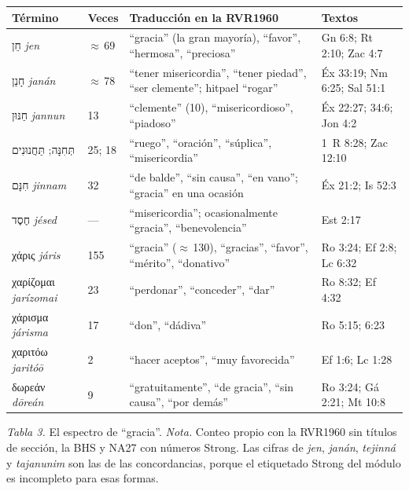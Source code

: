 \documentclass[11pt,letterpaper]{article}
\newcommand{\heb}[1]{\mbox{\foreignlanguage{hebrew}{#1}}}
\newcommand{\grc}[1]{\foreignlanguage{ancientgreek}{#1}}
\begin{document}
\begin{center}\small\renewcommand{\arraystretch}{1.16}
\begin{tabular}{@{}L{3.6cm}L{1.3cm}L{5.2cm}L{4.4cm}@{}}
\toprule
\textbf{Término} & \textbf{Veces} & \textbf{Traducción en la RVR1960} & \textbf{Textos} \\ \midrule
\heb{חֵן} \emph{jen} & $\approx$\,69 & ``gracia'' (la gran mayoría), ``favor'', ``hermosa'', ``preciosa'' & Gn 6:8; Rt 2:10; Zac 4:7 \\
\heb{חָנַן} \emph{janán} & $\approx$\,78 & ``tener misericordia'', ``tener piedad'', ``ser clemente''; hitpael ``rogar'' & Éx 33:19; Nm 6:25; Sal 51:1 \\
\heb{חַנּוּן} \emph{jannun} & 13 & ``clemente'' (10), ``misericordioso'', ``piadoso'' & Éx 22:27; 34:6; Jon 4:2 \\
\heb{תְּחִנָּה}; \heb{תַּחֲנוּנִים} & 25; 18 & ``ruego'', ``oración'', ``súplica'', ``misericordia'' & 1~R 8:28; Zac 12:10 \\
\heb{חִנָּם} \emph{jinnam} & 32 & ``de balde'', ``sin causa'', ``en vano''; ``gracia'' en una ocasión & Éx 21:2; Is 52:3 \\
\heb{חֶסֶד} \emph{jésed} & --- & ``misericordia''; ocasionalmente ``gracia'', ``benevolencia'' & Est 2:17 \\ \midrule
\grc{χάρις} \emph{járis} & 155 & ``gracia'' ($\approx$\,130), ``gracias'', ``favor'', ``mérito'', ``donativo'' & Ro 3:24; Ef 2:8; Lc 6:32 \\
\grc{χαρίζομαι} \emph{jarízomai} & 23 & ``perdonar'', ``conceder'', ``dar'' & Ro 8:32; Ef 4:32 \\
\grc{χάρισμα} \emph{járisma} & 17 & ``don'', ``dádiva'' & Ro 5:15; 6:23 \\
\grc{χαριτόω} \emph{jaritóō} & 2 & ``hacer aceptos'', ``muy favorecida'' & Ef 1:6; Lc 1:28 \\
\grc{δωρεάν} \emph{dōreán} & 9 & ``gratuitamente'', ``de gracia'', ``sin causa'', ``por demás'' & Ro 3:24; Gá 2:21; Mt 10:8 \\
\bottomrule
\end{tabular}\par
{\footnotesize\color{gris}\textit{Tabla 3.} El espectro de ``gracia''. \textit{Nota.} Conteo propio con la RVR1960 sin títulos de sección, la BHS y NA27 con números Strong. Las cifras de \emph{jen}, \emph{janán}, \emph{tejinná} y \emph{tajanunim} son las de las concordancias, porque el etiquetado Strong del módulo es incompleto para esas formas.}
\end{center}
\end{document}
